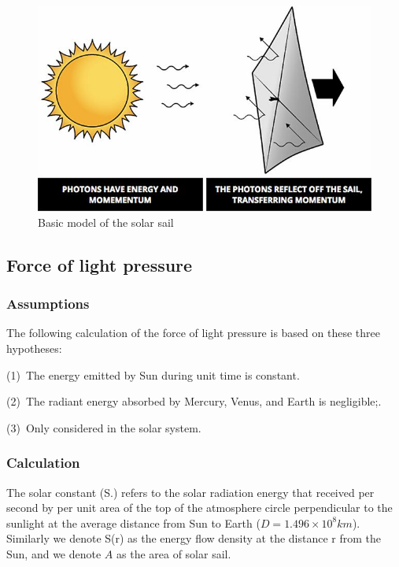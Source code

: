 \documentclass[../Paper.tex]{subfiles}
\begin{document}
\begin{figure}[H]
\centering
\includegraphics[scale=0.5]{../Figures/imagesolarsail.jpg}
\caption{Basic model of the solar sail}
\label{fig1}
\end{figure}
    
\subsection{Force of light pressure}

\subsubsection{Assumptions}

The following calculation of the force of light pressure is based on these three hypotheses:

(1)~The energy emitted by Sun during unit time is constant. 

(2)~The radiant energy absorbed by Mercury, Venus, and Earth is negligible;.

(3)~Only considered in the solar system.

\subsubsection{Calculation}

The solar constant (S.) refers to the solar radiation energy that received per second by per unit area of the top of the atmosphere circle perpendicular to the sunlight at the average distance from Sun to Earth ($D=1.496\times10^8km$). Similarly we denote S(r) as the energy flow density at the distance r from the Sun, and we denote $A$ as the area of solar sail.
\\
\end{document}
